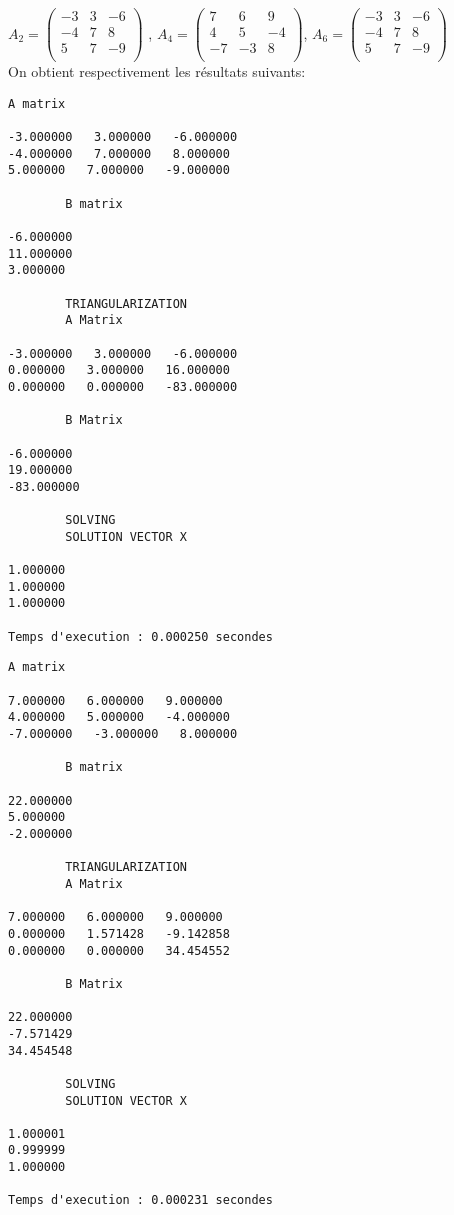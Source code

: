 \documentclass{report}
\begin{document}
$A_2 = \begin{pmatrix}
-3 & 3 & -6 \\
-4 & 7 &  8 \\
5 & 7 & -9 \\
\end{pmatrix}
$
,
$A_4 = \begin{pmatrix}
7 & 6 & 9 \\
4 & 5 &  -4\\
-7 & -3 & 8 \\
\end{pmatrix}
$,
$A_6 = \begin{pmatrix}
-3 & 3 & -6 \\
-4 & 7 &  8 \\
5 & 7 & -9 \\
\end{pmatrix}
$
\vspace{12pt}\\
On obtient respectivement les résultats suivants:
\\
\begin{lstlisting}[caption={$A_2X=B$} results, basicstyle=\fontsize{4}{6}\selectfont]
  		A matrix 

-3.000000   3.000000   -6.000000   
-4.000000   7.000000   8.000000   
5.000000   7.000000   -9.000000   

		B matrix 

-6.000000   
11.000000   
3.000000   

		TRIANGULARIZATION
		A Matrix 

-3.000000   3.000000   -6.000000   
0.000000   3.000000   16.000000   
0.000000   0.000000   -83.000000   

		B Matrix 

-6.000000   
19.000000   
-83.000000   

		SOLVING 
		SOLUTION VECTOR X 

1.000000   
1.000000   
1.000000   

Temps d'execution : 0.000250 secondes
\end{lstlisting}
\begin{lstlisting}[caption={$A_4X=B$} results, basicstyle=\fontsize{4}{6}\selectfont]
		A matrix 

7.000000   6.000000   9.000000   
4.000000   5.000000   -4.000000   
-7.000000   -3.000000   8.000000   

		B matrix 

22.000000   
5.000000   
-2.000000   

		TRIANGULARIZATION 
		A Matrix 

7.000000   6.000000   9.000000   
0.000000   1.571428   -9.142858   
0.000000   0.000000   34.454552   

		B Matrix 

22.000000   
-7.571429   
34.454548   

		SOLVING 
		SOLUTION VECTOR X 

1.000001   
0.999999   
1.000000   

Temps d'execution : 0.000231 secondes
\end{lstlisting}
\end{document}
